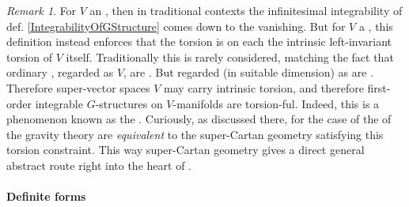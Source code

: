 \documentclass[12pt,titlepage]{article}
\theoremstyle{plain}
\theoremstyle{definition}
\theoremstyle{remark}
\newtheorem{remark}{Remark}
\begin{document}
\begin{remark}
\label{TorsionConstraints}\hypertarget{TorsionConstraints}{}
For $V$ an , then in traditional contexts the infinitesimal integrability of def. \ref{IntegrabilityOfGStructure} comes down to the  vanishing. But for $V$ a , this definition instead enforces that the torsion is on each  the intrinsic left-invariant torsion of $V$ itself.
Traditionally this is rarely considered, matching the fact that ordinary , regarded as  $V$, are . But  regarded (in suitable dimension) as  are . Therefore super-vector spaces $V$ may carry intrinsic torsion, and therefore first-order integrable $G$-structures on $V$-manifolds are torsion-ful.
Indeed, this is a phenomenon known as the . Curiously, as discussed there, for the case of  the  of the gravity theory are \emph{equivalent} to the super-Cartan geometry satisfying this torsion constraint. This way super-Cartan geometry gives a direct general abstract route right into the heart of .
\end{remark}
\hypertarget{definite_forms}{}\paragraph*{{Definite forms}}\label{definite_forms}
\end{document}
